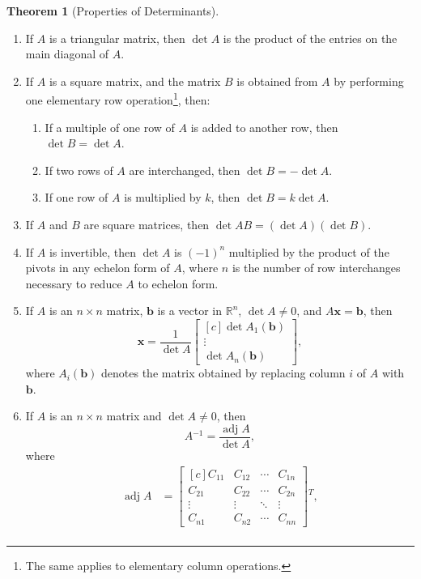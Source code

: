 \documentclass{myart}
\renewcommand{\vec}[1]{\ensuremath{\mathbf{#1}}} %
\newcommand{\mat}[1]{\ensuremath{#1}} %
\newcommand{\R}[1][]{\ensuremath{\mathbb{R}^{#1}}} %
\newcommand{\by}{\ensuremath{\times}} %
\newcommand{\MAT}[2][r]{\ensuremath{\begin{bmatrix*}[#1]#2\end{bmatrix*}}} %
\newcommand{\inv}{\ensuremath{^{-1}}} %
\newcommand{\trans}{\ensuremath{^T}} %
\DeclareMathOperator{\adj}{adj} %
\theoremstyle{definition}
\newtheorem{thm}{Theorem}
\begin{document}
\begin{thm}[Properties of Determinants] \hfill
\begin{enumerate}
\item If \mat A is a triangular matrix, then $\det \mat A$ is the product of the entries on the main diagonal of \mat A.
\item If \mat A is a square matrix, and the matrix \mat B is obtained from \mat A by performing one elementary row operation\footnote{The same applies to elementary column operations.}, then:
\begin{enumerate}
\item If a multiple of one row of \mat A is added to another row, then $\det \mat B = \det \mat A$.
\item If two rows of \mat A are interchanged, then $\det \mat B = -\det \mat A$.
\item If one row of \mat A is multiplied by $k$, then $\det \mat B = k \det \mat A$.
\end{enumerate}
\item If \mat A and \mat B are square matrices, then $\det \mat A\mat B = (\det \mat A)(\det \mat B)$.
\item If \mat A is invertible, then $\det \mat A$ is $(-1)^n$ multiplied by the product of the pivots in any echelon form of \mat A, where $n$ is the number of row interchanges necessary to reduce \mat A to echelon form.
\item If \mat A is an $n \by n$ matrix, \vec b is a vector in \R[n], $\det \mat A \neq 0$, and $\mat A\vec x = \vec b$, then
\begin{equation*}
\vec x = \frac{1}{\det \mat A} \MAT[c]{ \det \mat A_1(\vec b) \\ \vdots \\ \det \mat A_n(\vec b) },
\end{equation*}
where $\mat A_i(\vec b)$ denotes the matrix obtained by replacing column $i$ of \mat A with \vec b.
\item If \mat A is an $n \by n$ matrix and $\det \mat A \neq 0$, then
\begin{equation*}
\mat A\inv = \frac{\adj \mat A}{\det \mat A},
\end{equation*}
where
\begin{align*}
\adj \mat A &= \MAT[c]{ C_{11} & C_{12} & \cdots & C_{1n} \\ C_{21} & C_{22} & \cdots & C_{2n} \\ \vdots & \vdots & \ddots & \vdots \\ C_{n1} & C_{n2} & \cdots & C_{nn} }\trans, \\

\end{align*}
\end{enumerate}
\end{thm}
\end{document}
